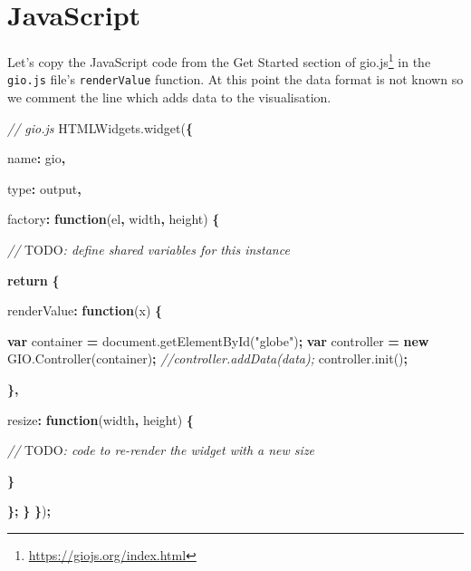 \documentclass[
]{krantz}
\makeatletter
\newenvironment{Shaded}{\begin{snugshade}}{\end{snugshade}}
\newcommand{\AlertTok}[1]{\textcolor[rgb]{0.33,0.33,0.33}{#1}}
\newcommand{\AttributeTok}[1]{\textcolor[rgb]{0.61,0.61,0.61}{#1}}
\newcommand{\CommentTok}[1]{\textcolor[rgb]{0.37,0.37,0.37}{\textit{#1}}}
\newcommand{\ControlFlowTok}[1]{\textcolor[rgb]{0.27,0.27,0.27}{\textbf{#1}}}
\newcommand{\DataTypeTok}[1]{\textcolor[rgb]{0.27,0.27,0.27}{#1}}
\newcommand{\KeywordTok}[1]{\textcolor[rgb]{0.27,0.27,0.27}{\textbf{#1}}}
\newcommand{\NormalTok}[1]{#1}
\newcommand{\OperatorTok}[1]{\textcolor[rgb]{0.43,0.43,0.43}{\textbf{#1}}}
\newcommand{\StringTok}[1]{\textcolor[rgb]{0.5,0.5,0.5}{#1}}
\newcommand{\VariableTok}[1]{\textcolor[rgb]{0,0,0}{#1}}
\renewcommand{\href}[2]{#2\footnote{\url{#1}}}
\newenvironment{kframe}{%
\medskip{}
\setlength{\fboxsep}{.8em}
 \def\at@end@of@kframe{}%
 \ifinner\ifhmode%
  \def\at@end@of@kframe{\end{minipage}}%
  \begin{minipage}{\columnwidth}%
 \fi\fi%
 \def\FrameCommand##1{\hskip\@totalleftmargin \hskip-\fboxsep
 \colorbox{shadecolor}{##1}\hskip-\fboxsep
     \hskip-\linewidth \hskip-\@totalleftmargin \hskip\columnwidth}%
 \MakeFramed {\advance\hsize-\width
   \@totalleftmargin\z@ \linewidth\hsize
   \@setminipage}}%
 {\par\unskip\endMakeFramed%
 \at@end@of@kframe}
\renewenvironment{Shaded}{\begin{kframe}}{\end{kframe}}
\makeatother
\begin{document}
\hypertarget{widgets-full-js}{%
\section{JavaScript}\label{widgets-full-js}}

Let's copy the JavaScript code from the \href{https://giojs.org/index.html}{Get Started section of gio.js} in the \texttt{gio.js} file's \texttt{renderValue} function. At this point the data format is not known so we comment the line which adds data to the visualisation.

\begin{Shaded}
\begin{Highlighting}[]
\CommentTok{// gio.js}
\VariableTok{HTMLWidgets}\NormalTok{.}\AttributeTok{widget}\NormalTok{(}\OperatorTok{\{}

  \DataTypeTok{name}\OperatorTok{:} \StringTok{\textquotesingle{}gio\textquotesingle{}}\OperatorTok{,}

  \DataTypeTok{type}\OperatorTok{:} \StringTok{\textquotesingle{}output\textquotesingle{}}\OperatorTok{,}

  \DataTypeTok{factory}\OperatorTok{:} \KeywordTok{function}\NormalTok{(el}\OperatorTok{,}\NormalTok{ width}\OperatorTok{,}\NormalTok{ height) }\OperatorTok{\{}

    \CommentTok{// }\AlertTok{TODO}\CommentTok{: define shared variables for this instance}

    \ControlFlowTok{return} \OperatorTok{\{}

      \DataTypeTok{renderValue}\OperatorTok{:} \KeywordTok{function}\NormalTok{(x) }\OperatorTok{\{}

        \KeywordTok{var}\NormalTok{ container }\OperatorTok{=} \VariableTok{document}\NormalTok{.}\AttributeTok{getElementById}\NormalTok{(}\StringTok{"globe"}\NormalTok{)}\OperatorTok{;}
        \KeywordTok{var}\NormalTok{ controller }\OperatorTok{=} \KeywordTok{new} \VariableTok{GIO}\NormalTok{.}\AttributeTok{Controller}\NormalTok{(container)}\OperatorTok{;}
        \CommentTok{//controller.addData(data);}
        \VariableTok{controller}\NormalTok{.}\AttributeTok{init}\NormalTok{()}\OperatorTok{;}

      \OperatorTok{\},}

      \DataTypeTok{resize}\OperatorTok{:} \KeywordTok{function}\NormalTok{(width}\OperatorTok{,}\NormalTok{ height) }\OperatorTok{\{}

        \CommentTok{// }\AlertTok{TODO}\CommentTok{: code to re{-}render the widget with a new size}

      \OperatorTok{\}}

    \OperatorTok{\};}
  \OperatorTok{\}}
\OperatorTok{\}}\NormalTok{)}\OperatorTok{;}
\end{Highlighting}
\end{Shaded}
\end{document}
